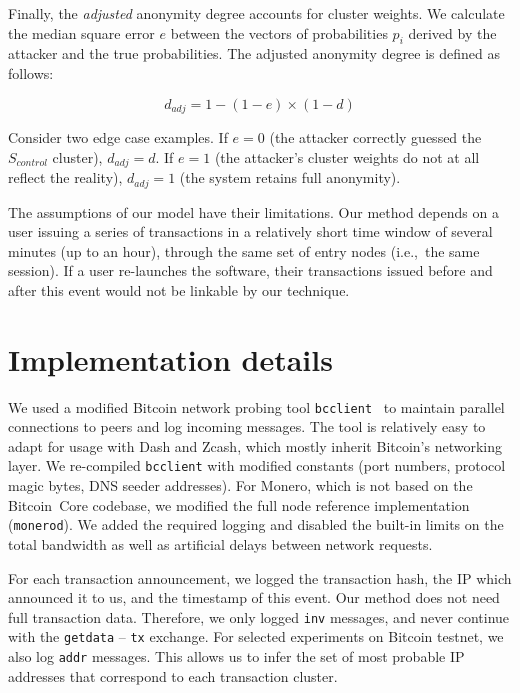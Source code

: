 Finally, the \textit{adjusted} anonymity degree accounts for cluster weights.
We calculate the median square error $e$ between the vectors of probabilities $p_i$ derived by the attacker and the true probabilities.
The adjusted anonymity degree is defined as follows:

\[
d_{adj} = 1 - (1 - e) \times (1 - d)
\]

Consider two edge case examples.
If $e = 0$ (the attacker correctly guessed the $S_{control}$ cluster), $d_{adj} = d$.
If $e = 1$ (the attacker's cluster weights do not at all reflect the reality), $d_{adj} = 1$ (the system retains full anonymity).

The assumptions of our model have their limitations.
Our method depends on a user issuing a series of transactions in a relatively short time window of several minutes (up to an hour), through the same set of entry nodes (i.e.,~the same session).
If a user re-launches the software, their transactions issued before and after this event would not be linkable by our technique.


\section{Implementation details}

We used a modified Bitcoin network probing tool \texttt{bcclient}~\cite{Pustogarov2017} to maintain parallel connections to peers and log incoming messages.
The tool is relatively easy to adapt for usage with Dash and Zcash, which mostly inherit Bitcoin's networking layer.
We re-compiled \texttt{bcclient} with modified constants (port numbers, protocol magic bytes, DNS seeder addresses).
For Monero, which is not based on the Bitcoin~Core codebase, we modified the full node reference implementation (\texttt{monerod}).
We added the required logging and disabled the built-in limits on the total bandwidth as well as artificial delays between network requests.

For each transaction announcement, we logged the transaction hash, the IP which announced it to us, and the timestamp of this event.
Our method does not need full transaction data.
Therefore, we only logged \texttt{inv} messages, and never continue with the \texttt{getdata} -- \texttt{tx} exchange.
For selected experiments on Bitcoin testnet, we also log \texttt{addr} messages.
This allows us to infer the set of most probable IP addresses that correspond to each transaction cluster.

